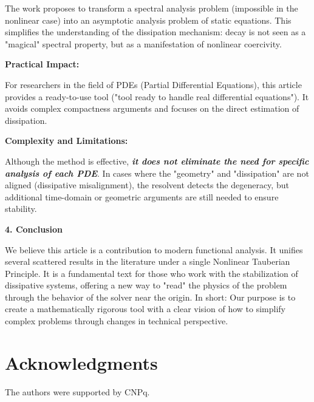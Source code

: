 \documentclass[11pt,reqno]{amsart}
\theoremstyle{remark}
\begin{document}
The work proposes to transform a spectral analysis problem (impossible in the nonlinear case) into an asymptotic analysis problem of static equations. This simplifies the understanding of the dissipation mechanism: decay is not seen as a "magical" spectral property, but as a manifestation of nonlinear coercivity. \medskip

{\bf Practical Impact:}

\medskip

For researchers in the field of PDEs (Partial Differential Equations), this article provides a ready-to-use tool ("tool ready to handle real differential equations"). It avoids complex compactness arguments and focuses on the direct estimation of dissipation.

\medskip

{\bf Complexity and Limitations:}

\medskip

Although the method is effective, {\bf \em it does not eliminate the need for specific analysis of each PDE}. In cases where the "geometry" and "dissipation" are not aligned (dissipative misalignment), the resolvent detects the degeneracy, but additional time-domain or geometric arguments are still needed to ensure stability.

\medskip

{\bf 4. Conclusion}

\medskip

We believe this article is a contribution to modern functional analysis. It unifies several scattered results in the literature under a single Nonlinear Tauberian Principle. It is a fundamental text for those who work with the stabilization of dissipative systems, offering a new way to "read" the physics of the problem through the behavior of the solver near the origin. In short: Our purpose is to create a mathematically rigorous tool with a clear vision of how to simplify complex problems through changes in technical perspective.


\section*{Acknowledgments}
The authors were supported by CNPq.
\end{document}
